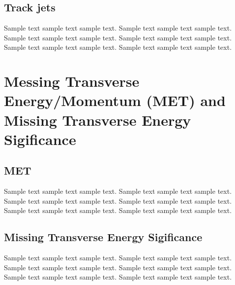 \subsection{Track jets}
\label{sec:track}
Sample text sample text sample text. Sample text sample text sample text.
Sample text sample text sample text. Sample text sample text sample text.
Sample text sample text sample text. Sample text sample text sample text.


\section{Messing Transverse Energy/Momentum (MET) and Missing Transverse Energy Sigificance}

\subsection{MET}
\label{sec:met}
Sample text sample text sample text. Sample text sample text sample text.
Sample text sample text sample text. Sample text sample text sample text.
Sample text sample text sample text. Sample text sample text sample text.
\subsection{Missing Transverse Energy Sigificance}
\label{sec:met_sig}
Sample text sample text sample text. Sample text sample text sample text.
Sample text sample text sample text. Sample text sample text sample text.
Sample text sample text sample text. Sample text sample text sample text.

